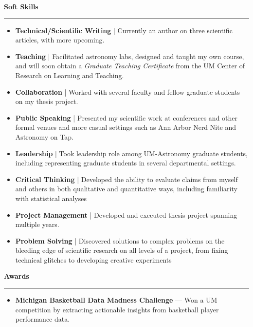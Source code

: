 \documentclass[10pt]{article}
\newcommand{\header}[1]{\vspace{1.5em}\par \textbf{\large #1}\strut\hrule\vspace{0em}}
\begin{document}
\header{Soft Skills}
\begin{itemize}
    \item {\bf Technical/Scientific Writing} | Currently an author on three scientific articles, with more upcoming.
    \item {\bf Teaching} | Facilitated astronomy labs, designed and taught my own course, and will soon obtain a {\it Graduate Teaching Certificate} from the UM Center of Research on Learning and Teaching. 
    \item {\bf Collaboration} | Worked with several faculty and fellow graduate students on my thesis project.
    \item {\bf Public Speaking} | Presented my scientific work at conferences and other formal venues and more casual settings such as Ann Arbor Nerd Nite and Astronomy on Tap.
    \item {\bf Leadership} | Took leadership role among UM-Astronomy graduate students, including representing graduate students in several departmental settings.
    \item {\bf Critical Thinking} | Developed the ability to evaluate claims from myself and others in both qualitative and quantitative ways, including familiarity with statistical analyses
    \item {\bf Project Management} | Developed and executed thesis project spanning multiple years. 
    \item {\bf Problem Solving} | Discovered solutions to complex problems on the bleeding edge of scientific research on all levels of a project, from fixing technical glitches to developing creative experiments
\end{itemize}

\header{Awards}
\begin{itemize}
    \item {\bf Michigan Basketball Data Madness Challenge} --- Won a UM competition by extracting actionable insights from basketball player performance data.
\end{itemize}
\end{document}

